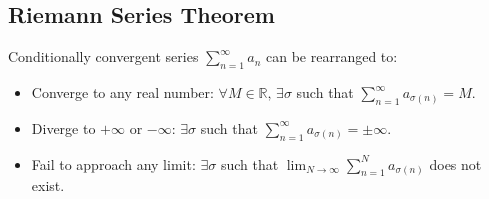\documentclass[a4paper,11pt]{article}
\theoremstyle{definition}
\theoremstyle{plain}
\theoremstyle{remark}
\begin{document}


\subsection{Riemann Series Theorem}

\begin{tcolorbox}
    Conditionally convergent series $\textstyle \sum_{n=1}^{\infty} a_n$ can be rearranged to:
    \begin{itemize}
        \item Converge to any real number: $\textstyle \forall M \in \mathbb{R}, \, \exists \sigma$ such that $\sum_{n=1}^{\infty} a_{\sigma (n)} = M$.
        \item Diverge to $+\infty$ or $-\infty$: $\textstyle \exists \sigma$ such that $\sum_{n=1}^{\infty} a_{\sigma (n)} = \pm \infty$.
        \item Fail to approach any limit: $\exists \sigma$ such that $\lim_{N \to \infty} \sum_{n=1}^N a_{\sigma (n)}$ does not exist.
    \end{itemize}
\end{tcolorbox}
\end{document}
